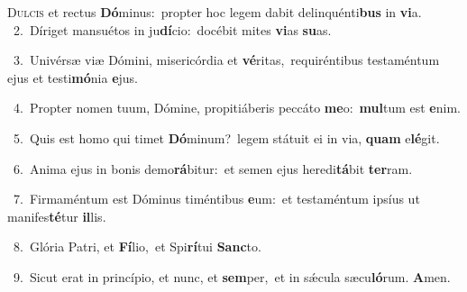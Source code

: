 \lettrine{\initial\textcolor{\initialcolor}{D}}{ulcis} et rectus \textbf{Dó}\-minus:~\star propter hoc legem dabit delinquénti\textbf{bus} in \textbf{vi}\-a.\\
{\numbfont\textcolor{\numbcolor}{~2.}}~Díriget mansuétos in ju\-\textbf{dí}\-cio:~\star docébit mites \textbf{vi}\-as \textbf{su}\-as.\par
{\numbfont\textcolor{\numbcolor}{~3.}}~Univérsæ viæ Dómini, misericórdia et \textbf{vé}\-ritas,~\star requiréntibus testaméntum ejus et testi\-\textbf{mó}\-nia \textbf{e}\-jus.\par
{\numbfont\textcolor{\numbcolor}{~4.}}~Propter nomen tuum, Dómine, propitiáberis peccáto \textbf{me}\-o:~\star \textbf{mul}\-tum est \textbf{e}\-nim.\par
{\numbfont\textcolor{\numbcolor}{~5.}}~Quis est homo qui timet \textbf{Dó}\-minum?~\star legem státuit ei in via, \textbf{quam} e\-\textbf{lé}\-git.\par
{\numbfont\textcolor{\numbcolor}{~6.}}~Anima ejus in bonis demo\-\textbf{rá}\-bitur:~\star et semen ejus heredi\-\textbf{tá}\-bit \textbf{ter}\-ram.\par
{\numbfont\textcolor{\numbcolor}{~7.}}~Firmaméntum est Dóminus timéntibus \textbf{e}\-um:~\star et testaméntum ipsíus ut manifes\-\textbf{té}\-tur \textbf{il}\-lis.\par
{\numbfont\textcolor{\numbcolor}{~8.}}~Glória Patri, et \textbf{Fí}\-lio,~\star et Spi\-\textbf{rí}\-tui \textbf{Sanc}\-to.\par
{\numbfont\textcolor{\numbcolor}{~9.}}~Sicut erat in princípio, et nunc, et \textbf{sem}\-per,~\star et in sǽcula sæcu\-\textbf{ló}\-rum. \textbf{A}\-men.\par
